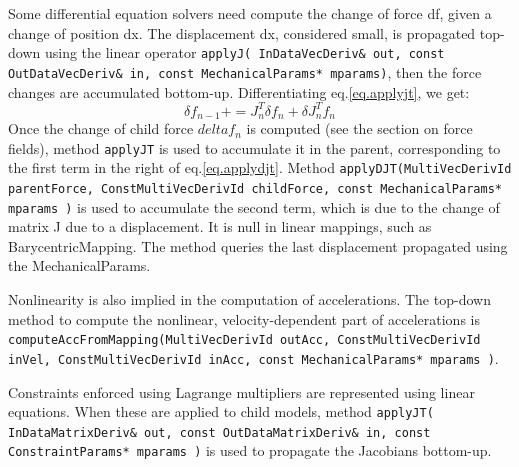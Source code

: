 Some differential equation solvers need compute the change of force df, given a change of position dx.
The displacement dx, considered small, is propagated top-down using the linear operator \texttt{applyJ( InDataVecDeriv\& out, const OutDataVecDeriv\& in, const MechanicalParams* mparams)}, then the force changes are accumulated bottom-up.
Differentiating eq.\ref{eq.applyjt}, we get:
\begin{equation}
 \label{eq.applydjt}
 \delta f_{n-1} += J_n^T \delta f_n + \delta J_n^T f_n
\end{equation}
Once the change of child force $delta f_n$ is computed (see the section on force fields), method \texttt{applyJT} is used to accumulate it in the parent, corresponding to the first term in the right of eq.\ref{eq.applydjt}.
Method \texttt{applyDJT(MultiVecDerivId parentForce, ConstMultiVecDerivId  childForce, const MechanicalParams* mparams  )} is used to accumulate the second term, which is due to the change of matrix J due to a displacement.
It is null in linear mappings, such as BarycentricMapping.
The method queries the last displacement propagated using the MechanicalParams.

Nonlinearity is also implied in the computation of accelerations.
The top-down method to compute the nonlinear, velocity-dependent part of accelerations is \texttt{computeAccFromMapping(MultiVecDerivId outAcc, ConstMultiVecDerivId inVel, ConstMultiVecDerivId inAcc, const MechanicalParams* mparams )}.

Constraints enforced using Lagrange multipliers are represented using linear equations.
When these are applied to child models, method \texttt{applyJT( InDataMatrixDeriv\& out, const OutDataMatrixDeriv\& in, const ConstraintParams* mparams )} is used to propagate the Jacobians bottom-up.








